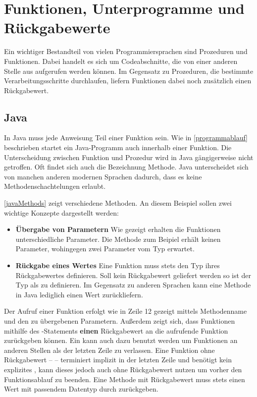 \section{Funktionen, Unterprogramme und Rückgabewerte}\label{sec:functionsAndReturnValues}
Ein wichtiger Bestandteil von vielen Programmiersprachen sind Prozeduren und Funktionen. Dabei handelt es sich um Codeabschnitte, die von einer anderen Stelle aus aufgerufen werden können. Im Gegensatz zu Prozeduren, die bestimmte Verarbeitungsschritte durchlaufen, liefern Funktionen dabei noch zusätzlich einen Rückgabewert.

\subsection*{Java}
In Java muss jede Anweisung Teil einer Funktion sein. Wie in \autoref{programmablauf} beschrieben startet ein Java-Programm auch innerhalb einer Funktion. Die Unterscheidung zwischen Funktion und Prozedur wird in Java gängigerweise nicht getroffen. Oft findet sich auch die Bezeichnung Methode. Java unterscheidet sich von manchen anderen modernen Sprachen dadurch, dass es keine Methodenschachtelungen erlaubt.

\autoref{javaMethods} zeigt verschiedene Methoden. An diesem Beispiel sollen zwei wichtige Konzepte dargestellt werden: 
\begin{itemize}
    \item \textbf{Übergabe von Parametern}
    Wie gezeigt erhalten die Funktionen unterschiedliche Parameter. Die Methode  zum Beipiel erhält keinen Parameter, wohingegen  zwei Parameter vom Typ  erwartet.
    \item \textbf{Rückgabe eines Wertes}
    Eine Funktion muss stets den Typ ihres Rückgabewertes definieren. Soll kein Rückgabewert geliefert werden so ist der Typ als  zu definieren. Im Gegensatz zu anderen Sprachen kann eine Methode in Java lediglich einen Wert zurückliefern.
\end{itemize}
Der Aufruf einer Funktion erfolgt wie in Zeile 12 gezeigt mittels Methodenname und den zu übergebenen Parametern. Außerdem zeigt sich, dass Funktionen mithilfe des -Statements \textbf{einen} Rückgabewert an die aufrufende Funktion zurückgeben können. Ein  kann auch dazu benutzt werden um Funktionen an anderen Stellen als der letzten Zeile zu verlassen. Eine Funktion ohne Rückgabewert --  -- terminiert implizit in der letzten Zeile und benötigt kein explizites , kann dieses jedoch auch ohne Rückgabewert nutzen um vorher den Funktionsablauf zu beenden. Eine Methode mit Rückgabewert muss stets einen Wert mit passendem Datentyp durch  zurückgeben.

